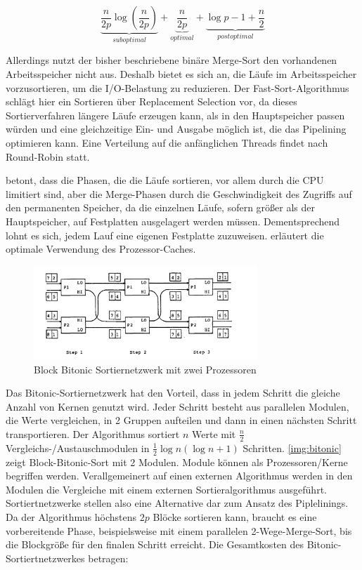 \documentclass[a4paper,12pt,twoside]{article}
\begin{document}
\[ \underbrace{\frac{n}{2p} \log \left( \frac{n}{2p} \right)}_{suboptimal} + \underbrace{\frac{n}{2p}}_{optimal} + \underbrace{\log p - 1 + \frac{n}{2}}_{postoptimal} \]

Allerdings nutzt der bisher beschriebene binäre Merge-Sort den vorhandenen Arbeitsspeicher nicht aus. Deshalb bietet es sich an, die Läufe im Arbeitsspeicher vorzusortieren, um die I/O-Belastung zu reduzieren. Der Fast-Sort-Algorithmus {\autocite{Tsukerman1986, Salzberg1990}} schlägt hier ein Sortieren über Replacement Selection {\autocite[vgl. ]{Knuth1973}} vor, da dieses Sortierverfahren längere Läufe erzeugen kann, als in den Hauptspeicher passen würden und eine gleichzeitige Ein- und Ausgabe möglich ist, die das Pipelining optimieren kann. Eine Verteilung auf die anfänglichen Threads findet nach Round-Robin statt.

{\textcite{Salzberg1990}} betont, dass die Phasen, die die Läufe sortieren, vor allem durch die CPU limitiert sind, aber die Merge-Phasen durch die Geschwindigkeit des Zugriffs auf den permanenten Speicher, da die einzelnen Läufe, sofern größer als der Hauptspeicher, auf Festplatten ausgelagert werden müssen. Dementsprechend lohnt es sich, jedem Lauf eine eigenen Festplatte zuzuweisen. {\textcite{Hao2009}} erläutert die optimale Verwendung des Prozessor-Caches.

\begin{figure}
	\centering
	\includegraphics[width=0.75\textwidth]{Bilder/bitonic_block.png}
	\caption{Block Bitonic Sortiernetzwerk mit zwei Prozessoren \autocite[S. 335]{Bitton1983}}
	\label{img:bitonic}
\end{figure}

Das Bitonic-Sortiernetzwerk {\autocite[S. 335f]{Bitton1983}} hat den Vorteil, dass in jedem Schritt die gleiche Anzahl von Kernen genutzt wird. Jeder Schritt besteht aus parallelen Modulen, die Werte vergleichen, in 2 Gruppen aufteilen und dann in einen nächsten Schritt transportieren. Der Algorithmus sortiert $n$ Werte mit $\frac {n} {2} $ Vergleichs-/Austauschmodulen in $\frac{1}{2} \log n (\log n +1)$ Schritten. \autoref{img:bitonic} zeigt Block-Bitonic-Sort mit 2 Modulen. Module können als Prozessoren/Kerne begriffen werden. Verallgemeinert auf einen externen Algorithmus werden in den Modulen die Vergleiche mit einem externen Sortieralgorithmus ausgeführt. Sortiertnetzwerke stellen also eine Alternative dar zum Ansatz des Piplelinings. Da der Algorithmus höchstens $2p$ Blöcke sortieren kann, braucht es eine vorbereitende Phase, beispielsweise mit einem parallelen 2-Wege-Merge-Sort, bis die Blockgröße für den finalen Schritt erreicht. Die Gesamtkosten des Bitonic-Sortiertnetzwerkes betragen:
\end{document}
